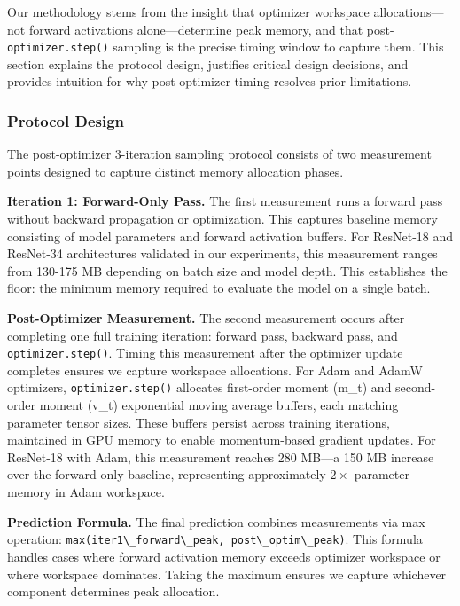
Our methodology stems from the insight that optimizer workspace allocations---not forward activations alone---determine peak memory, and that post-\texttt{optimizer.step()} sampling is the precise timing window to capture them. This section explains the protocol design, justifies critical design decisions, and provides intuition for why post-optimizer timing resolves prior limitations.

\subsubsection{Protocol Design}

The post-optimizer 3-iteration sampling protocol consists of two measurement points designed to capture distinct memory allocation phases.

\textbf{Iteration 1: Forward-Only Pass.} The first measurement runs a forward pass without backward propagation or optimization. This captures baseline memory consisting of model parameters and forward activation buffers. For ResNet-18 and ResNet-34 architectures validated in our experiments, this measurement ranges from 130-175 MB depending on batch size and model depth. This establishes the floor: the minimum memory required to evaluate the model on a single batch.

\textbf{Post-Optimizer Measurement.} The second measurement occurs after completing one full training iteration: forward pass, backward pass, and \texttt{optimizer.step()}. Timing this measurement after the optimizer update completes ensures we capture workspace allocations. For Adam and AdamW optimizers, \texttt{optimizer.step()} allocates first-order moment (m\_t) and second-order moment (v\_t) exponential moving average buffers, each matching parameter tensor sizes. These buffers persist across training iterations, maintained in GPU memory to enable momentum-based gradient updates. For ResNet-18 with Adam, this measurement reaches 280 MB---a 150 MB increase over the forward-only baseline, representing approximately $2\times$ parameter memory in Adam workspace.

\textbf{Prediction Formula.} The final prediction combines measurements via max operation: \texttt{max(iter1\textbackslash \_forward\textbackslash \_peak, post\textbackslash \_optim\textbackslash \_peak)}. This formula handles cases where forward activation memory exceeds optimizer workspace or where workspace dominates. Taking the maximum ensures we capture whichever component determines peak allocation.

